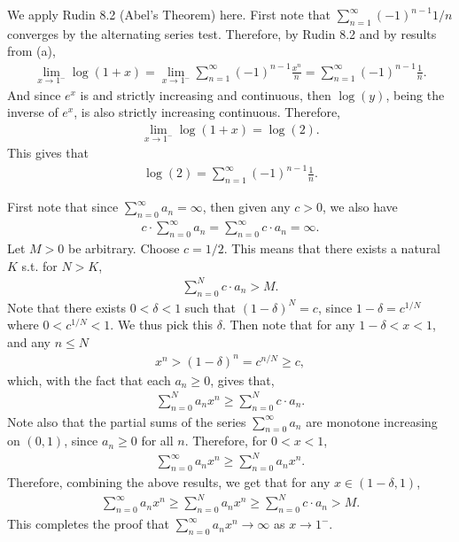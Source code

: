 \documentclass[12pt]{article}
\begin{document}
\begin{fproof}[1(b)]
We apply Rudin 8.2 (Abel's Theorem) here.
First note that \(\sum_{n=1}^{\infty} (-1)^{n-1}1/n\) converges by the alternating series test.
Therefore, by Rudin 8.2 and by results from (a),
\begin{align*}
    \lim_{x \to 1^-} \log(1+x) = \lim_{x \to 1^-} \sum_{n=1}^{\infty} (-1)^{n-1} \frac{x^n}{n}=  \sum_{n=1}^{\infty} (-1)^{n-1} \frac{1}{n}.
\end{align*}
And since \(e^x\) is and strictly increasing and continuous, then \(\log(y)\), being the inverse of \(e^x\), is also strictly increasing continuous. Therefore,
\begin{align*}
    \lim_{x \to 1^-} \log(1+x) = \log(2).
\end{align*}
This gives that
\begin{align*}
    \log(2) = \sum_{n=1}^{\infty} (-1)^{n-1} \frac{1}{n}. 
\end{align*}
\end{fproof}
\newpage

\begin{fproof}[2]
First note that since \(\sum_{n=0}^{\infty}a_n = \infty\), then given any \(c > 0\), we also have
\begin{align*}
    c \cdot \sum_{n=0}^{\infty}a_n = \sum_{n=0}^{\infty}c \cdot a_n = \infty.
\end{align*}
Let \(M > 0\) be arbitrary.
Choose \(c = 1/2\). 
This means that there exists a natural \(K\) s.t. for \(N > K\),
\begin{align*}
    \sum_{n=0}^{N} c \cdot a_n > M.
\end{align*}
Note that there exists  \(0 < \delta < 1\) such that \((1-\delta)^N = c\), since \(1 - \delta = c^{1/N}\) where \(0 < c^{1/N} < 1\).
We thus pick this \(\delta\).
Then note that for any \(1-\delta<x < 1\), and any \(n \leq N\)
\begin{align*}
    x^n > (1 - \delta)^n = c^{n/N} \geq c,
\end{align*}
which, with the fact that each \(a_n \geq 0\), gives that,
\begin{align*}
    \sum_{n=0}^{N} a_n x^n \geq \sum_{n=0}^{N} c \cdot a_n.
\end{align*}
Note also that the partial sums of the series \(\sum_{n=0}^{\infty} a_n\) are monotone increasing on \((0,1)\), since \(a_n \geq 0\) for all \(n\).
Therefore, for \(0 < x < 1\),
\begin{align*}
    \sum_{n=0}^{\infty} a_n x^n \geq \sum_{n=0}^{N} a_n x^n.
\end{align*}
Therefore, combining the above results, we get that for any \(x \in (1-\delta, 1)\),
\begin{align*}
    \sum_{n=0}^{\infty} a_n x^n \geq \sum_{n=0}^{N} a_n x^n \geq \sum_{n=0}^{N} c \cdot a_n > M.
\end{align*}
This completes the proof that \(\sum_{n=0}^{\infty} a_n x^n \to \infty\) as \(x \to 1^-\).


\end{fproof}
\newpage
\end{document}
